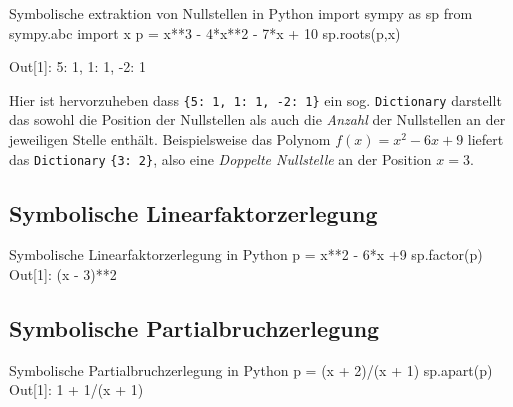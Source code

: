 



\begin{python}{Symbolische extraktion von Nullstellen in Python}
import sympy as sp
from sympy.abc import x
p = x**3 - 4*x**2 - 7*x + 10
sp.roots(p,x)

Out[1]: {5: 1, 1: 1, -2: 1}
\end{python}

Hier ist hervorzuheben dass \texttt{\{5: 1, 1: 1, -2: 1\}} ein sog. \texttt{Dictionary} darstellt das sowohl die Position der Nullstellen als auch die \emph{Anzahl} der Nullstellen an der jeweiligen Stelle enthält. 
Beispielsweise das Polynom $f(x) = x^2 - 6x + 9$ liefert das \texttt{Dictionary} \texttt{\{3: 2\}}, also eine \emph{Doppelte Nullstelle} an der Position $x=3$. 








\subsection{Symbolische Linearfaktorzerlegung}
\begin{python}{Symbolische Linearfaktorzerlegung in Python}
p = x**2 - 6*x +9
sp.factor(p)
Out[1]: (x - 3)**2
\end{python}


\subsection{Symbolische Partialbruchzerlegung}

\begin{python}{Symbolische Partialbruchzerlegung in Python}
p = (x + 2)/(x + 1)
sp.apart(p)
Out[1]: 1 + 1/(x + 1)
\end{python}




